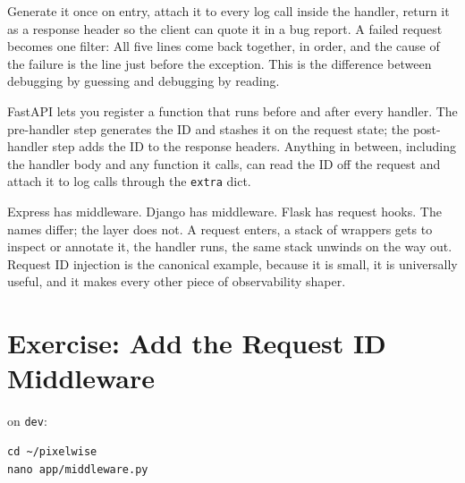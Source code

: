 Generate it once on entry, attach it to every log call inside the
handler, return it as a response header so the client can quote it in
a bug report. A failed request becomes one filter: All five lines come
back together, in order, and the cause of the failure is the line just
before the exception. This is the difference between debugging by
guessing and debugging by reading.


FastAPI lets you register a function that runs before and after every
handler. The pre-handler step generates the ID and stashes it on the
request state; the post-handler step adds the ID to the response
headers. Anything in between, including the handler body and any
function it calls, can read the ID off the request and attach it to
log calls through the \texttt{extra} dict.

Express has middleware. Django has middleware. Flask has request hooks.
The names differ; the layer does not. A request enters, a stack of
wrappers gets to inspect or annotate it, the handler runs, the same
stack unwinds on the way out. Request ID injection is the canonical
example, because it is small, it is universally useful, and it makes
every other piece of observability shaper.



\newpage
\section{Exercise: Add the Request ID Middleware}

 on \texttt{dev}:

\begin{verbatim}
cd ~/pixelwise
nano app/middleware.py
\end{verbatim}

